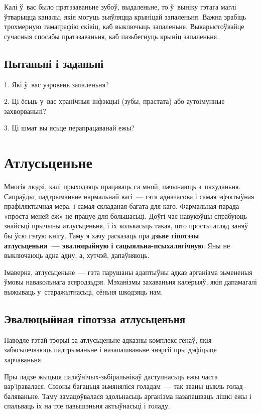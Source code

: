 Калі ў~вас было пратэзаваньне зубоў, выдаленьне, то ў~выніку гэтага маглі ўтварыцца каналы, якія могуць зьяўляцца крыніцай запаленьня. Важна зрабіць трохмерную тамаграфію сківіц, каб выключыць запаленьне. Выкарыстоўвайце сучасныя спосабы пратэзаваньня, каб пазьбегнуць крыніц запаленьня.

\subsection*{Пытаньні і заданьні}

1. Які ў~вас узровень запаленьня?

2. Ці ёсьць у~вас хранічныя інфэкцыі (зубы, прастата) або аутоімунные захворваньні?

3. Ці шмат вы ясьце перапрацаванай ежы?


\section{Атлусьценьне}

Многія людзі, калі прыходзяць працаваць са мной, пачынаюць з~пахуданьня. Сапраўды, падтрыманьне нармальнай вагі~--- гэта адначасова і самая эфэктыўная прафіляктычная мера, і самая складаная багата для каго. Фармальная парада «проста меней еж» не працуе для большасьці. Доўгі час навукоўцы спрабуюць знайсьці прычыны атлусьценьня, і іх колькасьць такая, што просты агляд заняў бы ўсю гэтую кнігу. Таму я хачу расказаць пра \textbf{дзьве гіпотэзы атлусьценьня~--- эвалюцыйную і сацыяльна-псыхалягічную}. Яны не выключаюць адна адну, а, хутчэй, дапаўняюць.

Імаверна, атлусьценьне~--- гэта парушаны адаптыўны адказ арганізма зьмененыя ўмовы навакольнага асяродзьдзя. Мэханізмы захаваньня калёрыяў, якія дапамагалі выжываць у~старажытнасьці, сёньня шкодзяць нам.

\subsection*{Эвалюцыйная гіпотэза атлусьценьня}

Паводле гэтай тэорыі за атлусьценьне адказны комплекс генаў, якія забясьпечваюць падтрыманьне і назапашваньне энэргіі пры дэфіцыце харчаваньня.

Пры ладзе жыцьця паляўнічых-зьбі\-раль\-ні\-каў даступнасьць ежы часта вар'іравалася. Сэзоны багацьця зьмяняліся голадам~--- так званы цыкль голад--баляваньне. Таму замацоўвалася здольнасьць арганізма назапашваць лішкі ежы і спальваць іх на тле павышэньня актыўнасьці і голаду. 

